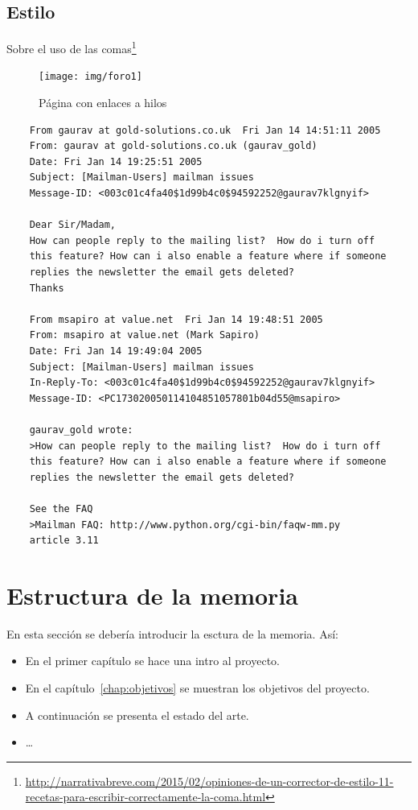 \documentclass[a4paper, 12pt]{book}
\begin{document}
\subsection{Estilo}
\label{subsec:estilo}

Sobre el uso de las comas\footnote{\url{http://narrativabreve.com/2015/02/opiniones-de-un-corrector-de-estilo-11-recetas-para-escribir-correctamente-la-coma.html}}

 \begin{figure}
    \centering
    \texttt{[image: img/foro1]}
    \caption{Página con enlaces a hilos}
    \label{figura:foro_hilos}
 \end{figure}

{\footnotesize
\begin{verbatim}
    From gaurav at gold-solutions.co.uk  Fri Jan 14 14:51:11 2005
    From: gaurav at gold-solutions.co.uk (gaurav_gold)
    Date: Fri Jan 14 19:25:51 2005
    Subject: [Mailman-Users] mailman issues
    Message-ID: <003c01c4fa40$1d99b4c0$94592252@gaurav7klgnyif>

    Dear Sir/Madam,
    How can people reply to the mailing list?  How do i turn off
    this feature? How can i also enable a feature where if someone
    replies the newsletter the email gets deleted?
    Thanks

    From msapiro at value.net  Fri Jan 14 19:48:51 2005
    From: msapiro at value.net (Mark Sapiro)
    Date: Fri Jan 14 19:49:04 2005
    Subject: [Mailman-Users] mailman issues
    In-Reply-To: <003c01c4fa40$1d99b4c0$94592252@gaurav7klgnyif>
    Message-ID: <PC173020050114104851057801b04d55@msapiro>

    gaurav_gold wrote:
    >How can people reply to the mailing list?  How do i turn off
    this feature? How can i also enable a feature where if someone
    replies the newsletter the email gets deleted?

    See the FAQ
    >Mailman FAQ: http://www.python.org/cgi-bin/faqw-mm.py
    article 3.11
\end{verbatim}
}

\section{Estructura de la memoria}
\label{sec:estructura}

En esta sección se debería introducir la esctura de la memoria. Así:

\begin{itemize}
  \item En el primer capítulo se hace una intro al proyecto.
  
  \item En el capítulo~\ref{chap:objetivos} se muestran los objetivos del proyecto.
  
  \item A continuación se presenta el estado del arte.
  
  \item \ldots
\end{itemize}
\end{document}

